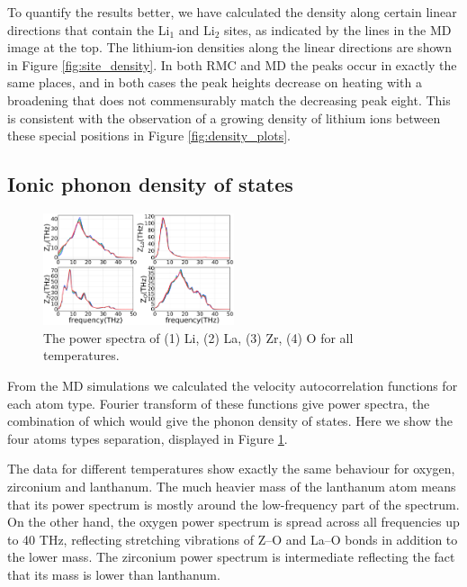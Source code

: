 \documentclass[twoside,twocolumn,9pt]{article}
\begin{document}
To quantify the results better, we have calculated the density along certain linear directions that contain the Li$_1$ and Li$_2$ sites, as indicated by the lines in the MD image at the top. The lithium-ion densities along the linear directions are shown in Figure \ref{fig:site_density}. In both RMC and MD the peaks occur in exactly the same places, and in both cases the peak heights decrease on heating with a broadening that does not commensurably match the decreasing peak eight. This is consistent with the observation of a growing density of lithium ions between these special positions in Figure \ref{fig:density_plots}.

\subsection{Ionic phonon density of states}

\begin{figure}[t]
\centering
\includegraphics[width=0.5\textwidth]{Pics/powerSpectra.pdf}
\caption{The power spectra of (1) Li, (2) La, (3) Zr, (4) O  for all temperatures.}
\label{fig:powerSpectra}
\end{figure}

From the MD simulations we calculated the velocity autocorrelation functions for each atom type. Fourier transform of these functions give power spectra, the combination of which would give the phonon density of states. Here we show the four atoms types separation, displayed in Figure \ref{fig:powerSpectra}.

The data for different temperatures show exactly the same behaviour for oxygen, zirconium and lanthanum. The much heavier mass of the lanthanum atom means that its power spectrum is mostly around the low-frequency part of the spectrum. On the other hand, the oxygen power spectrum is spread across all frequencies up to 40 THz, reflecting stretching vibrations of Z--O and La--O bonds in addition to the lower mass. The zirconium power spectrum is intermediate reflecting the fact that its mass is lower than lanthanum.
\end{document}
